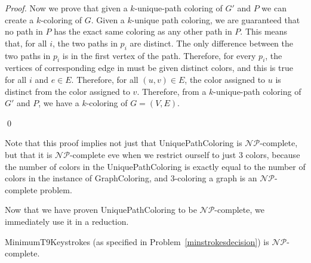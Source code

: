 \documentclass[runningheads]{llncs}
\newcommand{\NP}{\ensuremath{\mathcal{NP}}}
\begin{document}
\begin{proof}
Now we prove that given a $k$-unique-path coloring of $G'$ and $P$ we can
create a $k$-coloring of $G$.  Given a $k$-unique path coloring, we are
guaranteed that no path in $P$ has the exact same coloring as any other path in
$P$.  This means that, for all $i$, the two paths in $p_i$ are distinct.  The
only difference between the two paths in $p_i$ is in the first vertex of the
path.  Therefore, for every $p_i$, the vertices of corresponding edge in must
be given distinct colors, and this is true for all $i$ and $e \in E$.
Therefore, for all $(u,v)\in E$, the color assigned to $u$ is distinct from the
color assigned to $v$.  Therefore, from a $k$-unique-path coloring of $G'$ and
$P$, we have a $k$-coloring of $G=(V,E)$.

\qed 
\end{proof}

Note that this proof implies not just that {\sc UniquePathColoring} is \NP-complete, but that it is \NP-complete eve when we restrict ourself to just 3 colors, because the number of colors in the {\sc UniquePathColoring} is exactly equal to the number of colors in the instance of {\sc GraphColoring}, and 3-coloring a graph is an \NP-complete problem\cite{3color}.

Now that we have proven {\sc UniquePathColoring} to be \NP-complete, we
immediately use it in a reduction.  
\begin{theorem}{\sc MinimumT9Keystrokes} (as specified in
Problem~\ref{minstrokesdecision}) is \NP-complete.  \end{theorem}
\end{document}

